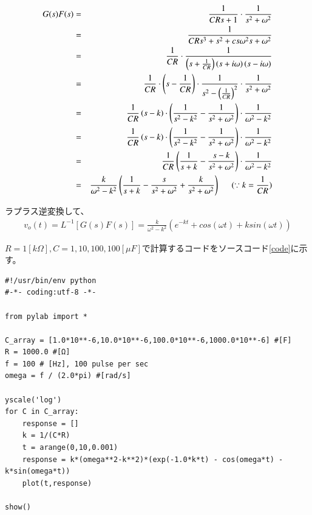 \documentclass[]{jsarticle}
\begin{document}
\begin{eqnarray*}
G(s)F(s) & = & \frac{1}{CRs+1} \cdot \frac{1}{s^{2}+\omega^{2}} \\
             & = & \frac{1}{CR s^{3}+s^{2}+cs\omega^{2}s+\omega^{2}} \\
             & = & \frac{1}{CR} \cdot \frac{1}{\left( s+\frac{1}{CR} \right)\left( s+i\omega \right)\left( s - i\omega\right)} \\
             & = & \frac{1}{CR} \cdot \left( s - \frac{1}{CR} \right) \cdot \frac{1}{s^{2} - \left( \frac{1}{CR} \right) ^{2}} \cdot \frac{1}{s^{2}+\omega^{2}} \\
             & = & \frac{1}{CR} \left( s - k \right) \cdot \left( \frac{1}{s^{2}-k^{2}} - \frac{1}{s^{2}+\omega^{2}} \right) \cdot \frac{1}{\omega^{2} - k^{2}} \\
             & = & \frac{1}{CR} \left( s - k \right) \cdot \left( \frac{1}{s^{2}-k^{2}} - \frac{1}{s^{2}+\omega^{2}} \right) \cdot \frac{1}{\omega^{2} - k^{2}} \\
             & = & \frac{1}{CR} \left( \frac{1}{s+k} - \frac{s-k}{s^{2}+\omega^{2}}\right) \cdot \frac{1}{\omega^{2} - k^{2}} \\
             & = & \frac{k}{\omega^{2}-k^{2}}\left( \frac{1}{s+k} - \frac{s}{s^{2}+\omega^{2}} + \frac{k}{s^{2}+\omega^{2}}\right) \hspace{0.5cm} (\because k = \frac{1}{CR})
\end{eqnarray*}

ラプラス逆変換して、
\begin{eqnarray*}
v_{o}(t) = L^{-1}[G(s)F(s)] = \frac{k}{\omega^{2}-k^{2}}\left( e^{-kt} + cos(\omega t) + k sin(\omega t)\right)
\end{eqnarray*}

$R = 1 [k \Omega], C=1,10,100,100[\mu F] $で計算するコードをソースコード\ref{code}に示す。

\begin{lstlisting}[caption=正弦波入力に対する応答解析,label=code]
#!/usr/bin/env python
#-*- coding:utf-8 -*-

from pylab import *

C_array = [1.0*10**-6,10.0*10**-6,100.0*10**-6,1000.0*10**-6] #[F]
R = 1000.0 #[Ω]
f = 100 # [Hz], 100 pulse per sec
omega = f / (2.0*pi) #[rad/s]

yscale('log')
for C in C_array:
    response = [] 
    k = 1/(C*R)
    t = arange(0,10,0.001)
    response = k*(omega**2-k**2)*(exp(-1.0*k*t) - cos(omega*t) - k*sin(omega*t))
    plot(t,response)

show()
\end{lstlisting}
\end{document}

